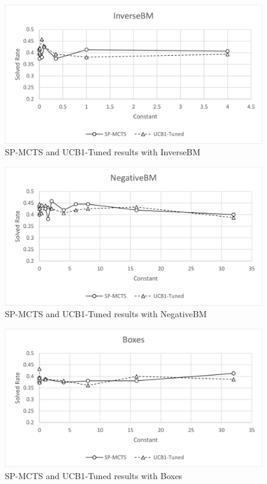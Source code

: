 \begin{figure}[!h]
    \centering
    \includegraphics[width=0.8\linewidth]{pictures/Sokoban-SP-Inverse.png}
    \caption{SP-MCTS and UCB1-Tuned results with InverseBM}
    \label{fig:spmcts_inverse}
\end{figure}

\begin{figure}[!h]
    \centering
    \includegraphics[width=0.8\linewidth]{pictures/Sokoban-SP-Negative.png}
    \caption{SP-MCTS and UCB1-Tuned results with NegativeBM}
    \label{fig:spmcts_negative}
\end{figure}

\clearpage

\begin{figure}[!h]
    \centering
    \includegraphics[width=0.8\linewidth]{pictures/Sokoban-SP-Boxes.png}
    \caption{SP-MCTS and UCB1-Tuned results with Boxes}
    \label{fig:spmcts_boxes}
\end{figure}

